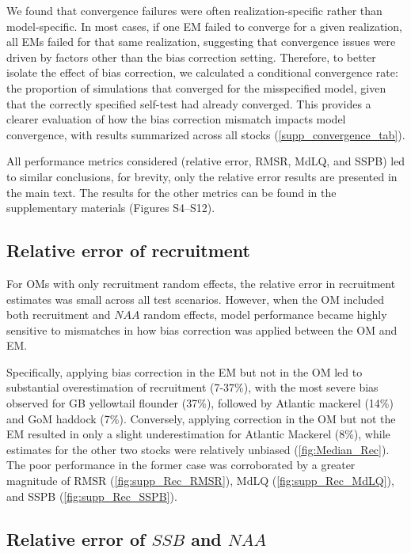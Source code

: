 \documentclass[
  12pt,
]{article}
\begin{document}
We found that convergence failures were often realization-specific
rather than model-specific. In most cases, if one EM failed to converge
for a given realization, all EMs failed for that same realization,
suggesting that convergence issues were driven by factors other than the
bias correction setting. Therefore, to better isolate the effect of bias
correction, we calculated a conditional convergence rate: the proportion
of simulations that converged for the misspecified model, given that the
correctly specified self-test had already converged. This provides a
clearer evaluation of how the bias correction mismatch impacts model
convergence, with results summarized across all stocks
(\autoref{supp_convergence_tab}).

All performance metrics considered (relative error, RMSR, MdLQ, and
SSPB) led to similar conclusions, for brevity, only the relative error
results are presented in the main text. The results for the other
metrics can be found in the supplementary materials (Figures S4--S12).

\subsection{Relative error of
recruitment}\label{relative-error-of-recruitment}

For OMs with only recruitment random effects, the relative error in
recruitment estimates was small across all test scenarios. However, when
the OM included both recruitment and \(NAA\) random effects, model
performance became highly sensitive to mismatches in how bias correction
was applied between the OM and EM.

Specifically, applying bias correction in the EM but not in the OM led
to substantial overestimation of recruitment (7-37\%), with the most
severe bias observed for GB yellowtail flounder (37\%), followed by
Atlantic mackerel (14\%) and GoM haddock (7\%). Conversely, applying
correction in the OM but not the EM resulted in only a slight
underestimation for Atlantic Mackerel (8\%), while estimates for the
other two stocks were relatively unbiased (\autoref{fig:Median_Rec}).
The poor performance in the former case was corroborated by a greater
magnitude of RMSR (\autoref{fig:supp_Rec_RMSR}), MdLQ
(\autoref{fig:supp_Rec_MdLQ}), and SSPB (\autoref{fig:supp_Rec_SSPB}).

\subsection{\texorpdfstring{Relative error of \(SSB\) and
\(NAA\)}{Relative error of SSB and NAA}}\label{relative-error-of-ssb-and-naa}
\end{document}
